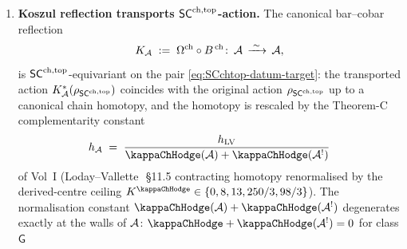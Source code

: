 \begin{proposition}
\begin{enumerate}[label=\textup{(\alph*)}]
\begin{equation}
{{ $\SCchtop$-action on $(Z^{\mathrm{der}}_{\mathrm{ch}}(\cA),\cA)$
 computed from $F$ agrees, under the named equivalence
 $F\leftrightarrow(2)$, with the
 action~\eqref{eq:bar-coalg-mc} transported through the
 adjunction $\Omega^{\mathrm{ch}}\dashv B^{\,\mathrm{ch}}$
 and the Koszul duality
 \eqref{eq:endch-bar-cobar}.}}
\end{equation}
The closed colour computes through Voronov's half-plane
model $\FM_k(\mathbb{H})$ of the Swiss-cheese operad
(\cite{Voronov1998}\,\S2, with the $E_1$-chiral enrichment of
Hoefel--Livernet~\cite{HL12}\,Theorem~3.1); the
factorisation face matches Costello--Gwilliam
Vol~II~\cite{CG21}\,Theorem~7.3.7 bulk--boundary restriction
on $X\times\R_{\geq 0}$; the Koszul-dual face is the
$L_\infty$-convolution datum of Vallette~\cite{Val07}; the
Drinfeld-centre face is the $\infty$-categorical centre of
$\Rep_{\mathrm{fact}}(\cA)$ in the sense of Lurie
HA~5.3.1.30~\cite{LurieHA}; the derived-algebraic-geometry face
is the $1$-shifted symplectic structure on the mapping stack
$\bMap(X, \mathcal{M}_{\SCchtop})$ in the sense of
PTVV~\cite{PTVV13}\,Theorem~2.5; the mixed bulk-to-boundary sector
matches the Dimofte slab trace~\cite{Dimofte25}. All seven
projections factor through
$B^{\,\mathrm{ch}}(\cA)$ as the unique cofibrant replacement of
$\cA$ in the operadic model structure on
$E_1\text{-chiralAlg}_X$ (Hinich~\cite{Hinich97}\,Theorem~4.7.4).
\item \textbf{Koszul reflection transports $\mathsf{SC}^{\mathrm{ch},\mathrm{top}}$-action.}
The canonical bar--cobar reflection
\begin{equation}\label{eq:koszul-reflection-SC}
 K_{\mathcal{A}}\;:=\;\Omega^{\mathrm{ch}}\circ B^{\,\mathrm{ch}}\colon
 \,\mathcal{A}\,\xrightarrow{\;\sim\;}\,\mathcal{A},
\end{equation}
is $\mathsf{SC}^{\mathrm{ch},\mathrm{top}}$-equivariant on the pair
\eqref{eq:SCchtop-datum-target}: the transported action
$K_{\mathcal{A}}^\ast(\rho_{\mathsf{SC}^{\mathrm{ch},\mathrm{top}}})$ coincides with the original
action $\rho_{\mathsf{SC}^{\mathrm{ch},\mathrm{top}}}$ up to a canonical chain homotopy,
and the homotopy is rescaled by the Theorem-C complementarity
constant
\begin{equation}\label{eq:chain-homotopy-normalisation}
 h_\cA
 \;=\;
 \frac{h_{\mathrm{LV}}}{\kappaChHodge(\cA)+\kappaChHodge(\cA^!)}
\end{equation}
of Vol~I (Loday--Vallette~\cite{LV12}\,\S11.5 contracting
homotopy renormalised by the derived-centre ceiling
$K^{\kappaChHodge}\in\{0,8,13,250/3,98/3\}$). The normalisation
constant $\kappaChHodge(\cA)+\kappaChHodge(\cA^!)$ degenerates exactly at
the walls of $\cA$: $\kappaChHodge+\kappaChHodge(\cA^!)=0$ for class $\mathsf G$

\end{enumerate}
\end{proposition}
